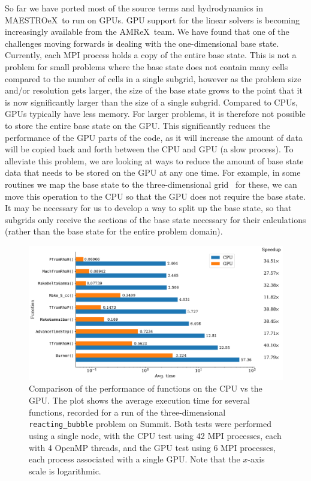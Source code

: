 \documentclass[a4paper]{jpconf}
\newcommand{\maestroex}{{\sffamily MAESTROeX}}
\newcommand{\amrex}{{\sffamily AMReX}}
\begin{document}
So far we have ported most of the source terms and hydrodynamics in \maestroex~to run on GPUs. GPU support for the linear solvers is becoming increasingly available from the \amrex~team.  We have found that one of the challenges moving forwards is dealing with the one-dimensional base state. Currently, each MPI process holds a copy of the entire base state. This is not a problem for small problems where the base state does not contain many cells compared to the number of cells in a single subgrid, however as the problem size and/or resolution gets larger, the size of the base state grows to the point that it is now significantly larger than the size of a single subgrid. Compared to CPUs, GPUs typically have less memory. For larger problems, it is therefore not possible to store the entire base state on the GPU. This significantly reduces the performance of the GPU parts of the code, as it will increase the amount of data will be copied back and forth between the CPU and GPU (a slow process). To alleviate this problem, we are looking at ways to reduce the amount of base state data that needs to be stored on the GPU at any one time. For example, in some routines we map the base state to the three-dimensional grid \textendash~for these, we can move this operation to the CPU so that the GPU does not require the base state. It may be necessary for us to develop a way to split up the base state, so that subgrids only receive the sections of the base state necessary for their calculations (rather than the base state for the entire problem domain). 

\begin{figure}\label{fig:gpu_speedup}
    \centering

    \includegraphics[width=\textwidth]{plots/gpu_speedup}

    \caption{Comparison of the performance of functions on the CPU vs the GPU. The plot shows the average execution time for several functions, recorded for a run of the three-dimensional \texttt{reacting\_bubble} problem on Summit. Both tests were performed using a single node, with the CPU test using 42 MPI processes, each with 4 OpenMP threads, and the GPU test using 6 MPI processes, each process associated with a single GPU. Note that the $x$-axis scale is logarithmic.}

\end{figure}
\end{document}
